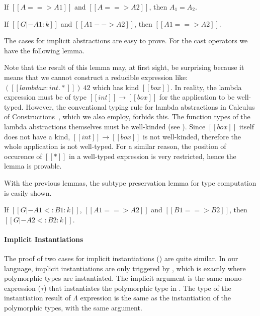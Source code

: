 \begin{lemma}
    If $[[A ==> A1]]$ and $[[A ==> A2]]$,
    then $A_1 = A_2$.
\end{lemma}

\begin{lemma}
    If $[[G |- A1 : k]]$ and $[[A1 --> A2]]$,
    then $[[A1 ==> A2]]$.
\end{lemma}

The cases for implicit abstractions are easy to prove. For the cast operators
we have the following lemma.


Note that the result of this lemma may, at first sight, be surprising
because it means that we cannot construct
a reducible expression like: $([[lambda x : int. *]])~42$ which has kind $[[box]]$.
In reality, the lambda expression must be of type $[[int]] \rightarrow [[box]]$
for the application to be well-typed. However, the conventional typing rule for
lambda abstractions in Calculus of Constructions~\cite{coc}, which we also employ,
forbids this. The function types of the lambda abstractions themselves
must be well-kinded (see ). Since $[[box]]$ itself does not have a kind,
$[[int]] \rightarrow [[box]]$ is not well-kinded, therefore the whole application
is not well-typed. For a similar reason, the position of occurence of $[[*]]$
in a well-typed expression is very restricted, hence the lemma is provable.

With the previous lemmas, the subtype preservation lemma for type computation is easily shown.

\begin{lemma}
    If $[[G |- A1 <: B1 : k]]$, $[[A1 ==> A2]]$ and $[[B1 ==> B2]]$,
    then $[[G |- A2 <: B2 : k]]$.
\end{lemma}

\paragraph{Implicit Instantiations}
The proof of two cases for implicit instantiations ()
are quite similar. In our language, implicit instantiations are only triggered by
, which is exactly where polymorphic types are instantiated.
The implicit argument is the same mono-expression ($\tau$) that
instantiates the polymorphic type in .
The type of the instantiation result of $\Lambda$ expression is the same as the
instantiation of the polymorphic types, with the same argument.

